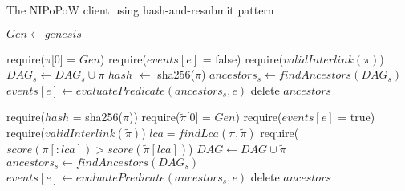 \begin{algorithm}
    \label{alg.har-nipopow}
    \caption{The \textsf{NIPoPoW} client using hash-and-resubmit pattern}
    \begin{algorithmic}[1]
            \State $Gen \gets genesis$
        \EndFunction
    \vskip8pt
    \end{algorithmic}

    \begin{algorithmic}[1]
        \State require($\pi$[0] = $Gen$)
        \State require($events[e]$ = false)
        \State require($validInterlink(\pi)$)
        \State $DAG_s \gets DAG_s \cup \pi$
        \State $hash$ $\gets$ sha256($\pi$)
        \State $ancestors_s \gets findAncestors(DAG_s)$
        \State $events[e] \gets evaluatePredicate(ancestors_s, e)$
        \State delete $ancestors$
    \EndFunction
    \vskip8pt
    \end{algorithmic}

    \begin{algorithmic}[1]
        \State require($hash$ = sha256($\pi$))
        \State require($\tilde\pi$[0] = $Gen$)
        \State require($events[e]$ = true)
        \State require($validInterlink(\tilde\pi)$)
        \State $lca = findLca(\pi, \tilde\pi)$
        \State require($score(\pi[:lca]) > score(\tilde\pi[lca])$)
        \State $DAG \gets DAG \cup \tilde\pi$
        \State $ancestors_s \gets findAncestors(DAG_s)$
        \State $events[e] \gets evaluatePredicate(ancestors_s, e)$
        \State delete $ancestors$
    \EndFunction
    \vskip8pt
    \end{algorithmic}
\end{algorithm}

